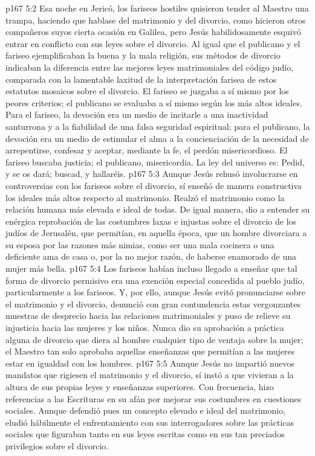 \vs p167 5:2 \pc Esa noche en Jericó, los fariseos hostiles quisieron tender al Maestro una trampa, haciendo que hablase del matrimonio y del divorcio, como hicieron otros compañeros suyos cierta ocasión en Galilea, pero Jesús habilidosamente esquivó entrar en conflicto con sus leyes sobre el divorcio. Al igual que el publicano y el fariseo ejemplificaban la buena y la mala religión, sus métodos de divorcio indicaban la diferencia entre las mejores leyes matrimoniales del código judío, comparada con la lamentable laxitud de la interpretación farisea de estos estatutos mosaicos sobre el divorcio. El fariseo se juzgaba a sí mismo por los peores criterios; el publicano se evaluaba a sí mismo según los más altos ideales. Para el fariseo, la devoción era un medio de incitarle a una inactividad santurrona y a la fiabilidad de una falsa seguridad espiritual; para el publicano, la devoción era un medio de estimular el alma a la concienciación de la necesidad de arrepentirse, confesar y aceptar, mediante la fe, el perdón misericordioso. El fariseo buscaba justicia; el publicano, misericordia. La ley del universo es: Pedid, y se os dará; buscad, y hallaréis.
\vs p167 5:3 Aunque Jesús rehusó involucrarse en controversias con los fariseos sobre el divorcio, sí enseñó de manera constructiva los ideales más altos respecto al matrimonio. Realzó el matrimonio como la relación humana más elevada e ideal de todas. De igual manera, dio a entender su enérgica reprobación de las costumbres laxas e injustas sobre el divorcio de los judíos de Jerusalén, que permitían, en aquella época, que un hombre divorciara a su esposa por las razones más nimias, como ser una mala cocinera o una deficiente ama de casa o, por la no mejor razón, de haberse enamorado de una mujer más bella.
\vs p167 5:4 Los fariseos habían incluso llegado a enseñar que tal forma de divorcio permisivo era una exención especial concedida al pueblo judío, particularmente a los fariseos. Y, por ello, aunque Jesús evitó pronunciarse sobre el matrimonio y el divorcio, denunció con gran contundencia estas vergonzantes muestras de desprecio hacia las relaciones matrimoniales y puso de relieve su injusticia hacia las mujeres y los niños. Nunca dio su aprobación a práctica alguna de divorcio que diera al hombre cualquier tipo de ventaja sobre la mujer; el Maestro tan solo aprobaba aquellas enseñanzas que permitían a las mujeres estar en igualdad con los hombres.
\vs p167 5:5 Aunque Jesús no impartió nuevos mandatos que rigiesen el matrimonio y el divorcio, sí instó a que vivieran a la altura de sus propias leyes y enseñanzas superiores. Con frecuencia, hizo referencias a las Escrituras en su afán por mejorar sus costumbres en cuestiones sociales. Aunque defendió pues un concepto elevado e ideal del matrimonio, eludió hábilmente el enfrentamiento con sus interrogadores sobre las prácticas sociales que figuraban tanto en sus leyes escritas como en sus tan preciados privilegios sobre el divorcio.
